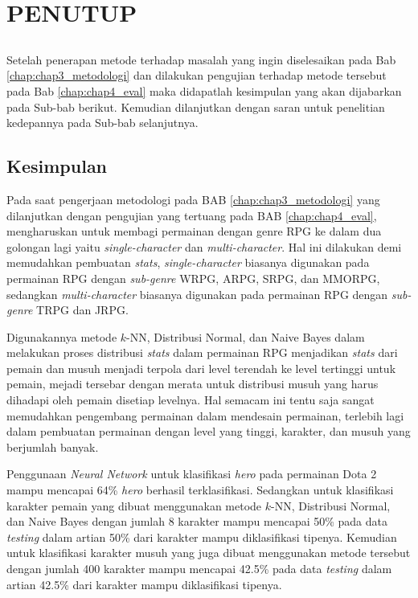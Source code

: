 \chapter{PENUTUP}
\label{sec:chap5_tutup}
\vspace{1ex}

\section*{}
Setelah penerapan metode terhadap masalah yang ingin diselesaikan pada Bab \ref{chap:chap3_metodologi} dan dilakukan pengujian terhadap metode tersebut pada Bab \ref*{chap:chap4_eval} maka didapatlah kesimpulan yang akan dijabarkan pada Sub-bab berikut. Kemudian dilanjutkan dengan saran untuk penelitian kedepannya pada Sub-bab selanjutnya.
\vspace{1ex}

\section{Kesimpulan}
\label{sec:sec4_kesimpulan}
\vspace{1ex}

Pada saat pengerjaan metodologi pada BAB \ref{chap:chap3_metodologi} yang dilanjutkan dengan pengujian yang tertuang pada BAB \ref{chap:chap4_eval}, mengharuskan untuk membagi permainan dengan genre RPG ke dalam dua golongan lagi yaitu \textit{single-character} dan \textit{multi-character}. Hal ini dilakukan demi memudahkan pembuatan \textit{stats}, \textit{single-character} biasanya digunakan pada permainan RPG dengan \textit{sub-genre} WRPG, ARPG, SRPG, dan MMORPG, sedangkan \textit{multi-character} biasanya digunakan pada permainan RPG dengan \textit{sub-genre} TRPG dan JRPG.
\vspace{1ex}

Digunakannya metode $k$-NN, Distribusi Normal, dan Naive Bayes dalam melakukan proses distribusi \textit{stats} dalam permainan RPG menjadikan \textit{stats} dari pemain dan musuh menjadi terpola dari level terendah ke level tertinggi untuk pemain, mejadi tersebar dengan merata untuk distribusi musuh yang harus dihadapi oleh pemain disetiap levelnya. Hal semacam ini tentu saja sangat memudahkan pengembang permainan dalam mendesain permainan, terlebih lagi dalam pembuatan permainan dengan level yang tinggi, karakter, dan musuh yang berjumlah banyak.
\vspace{1ex}

Penggunaan \textit{Neural Network} untuk klasifikasi \textit{hero} pada permainan Dota 2 mampu mencapai 64\% \textit{hero} berhasil terklasifikasi. Sedangkan untuk klasifikasi karakter pemain yang dibuat menggunakan metode $k$-NN, Distribusi Normal, dan Naive Bayes dengan jumlah 8 karakter mampu mencapai 50\% pada data \textit{testing} dalam artian 50\% dari karakter mampu diklasifikasi tipenya. Kemudian untuk klasifikasi karakter musuh yang juga dibuat menggunakan metode tersebut dengan jumlah 400 karakter mampu mencapai 42.5\% pada data \textit{testing} dalam artian 42.5\% dari karakter mampu diklasifikasi tipenya.
\vspace{1ex}

